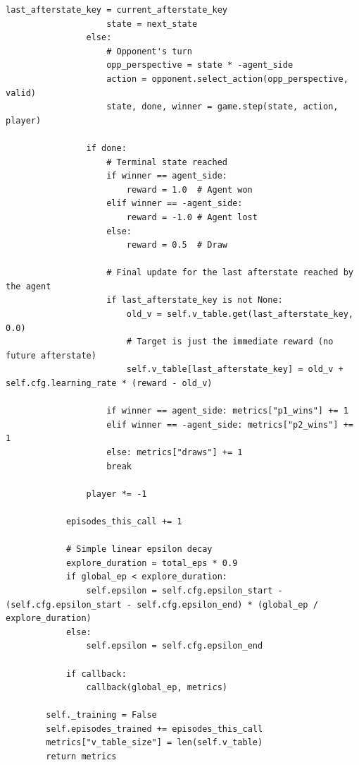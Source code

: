 {\begin{lstlisting}[style=mypython]
                    last_afterstate_key = current_afterstate_key
                    state = next_state
                else:
                    # Opponent's turn
                    opp_perspective = state * -agent_side
                    action = opponent.select_action(opp_perspective, valid)
                    state, done, winner = game.step(state, action, player)

                if done:
                    # Terminal state reached
                    if winner == agent_side:
                        reward = 1.0  # Agent won
                    elif winner == -agent_side:
                        reward = -1.0 # Agent lost
                    else:
                        reward = 0.5  # Draw
                        
                    # Final update for the last afterstate reached by the agent
                    if last_afterstate_key is not None:
                        old_v = self.v_table.get(last_afterstate_key, 0.0)
                        # Target is just the immediate reward (no future afterstate)
                        self.v_table[last_afterstate_key] = old_v + self.cfg.learning_rate * (reward - old_v)
                        
                    if winner == agent_side: metrics["p1_wins"] += 1
                    elif winner == -agent_side: metrics["p2_wins"] += 1
                    else: metrics["draws"] += 1
                    break
                    
                player *= -1

            episodes_this_call += 1

            # Simple linear epsilon decay
            explore_duration = total_eps * 0.9
            if global_ep < explore_duration:
                self.epsilon = self.cfg.epsilon_start - (self.cfg.epsilon_start - self.cfg.epsilon_end) * (global_ep / explore_duration)
            else:
                self.epsilon = self.cfg.epsilon_end
            
            if callback:
                callback(global_ep, metrics)
                
        self._training = False
        self.episodes_trained += episodes_this_call
        metrics["v_table_size"] = len(self.v_table)
        return metrics
\end{lstlisting}
}

